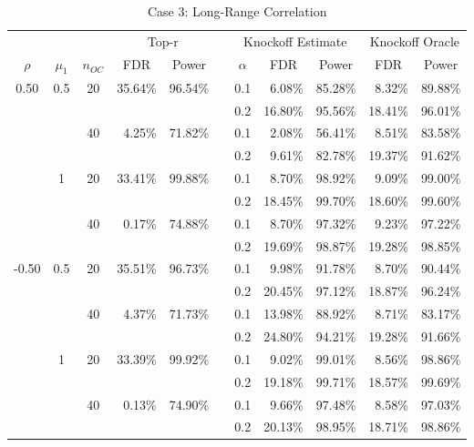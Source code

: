\documentclass[a4paper,12pt]{article}
\begin{document}
\begin{table}[htbp]
  \centering
  \caption{Case 3: Long-Range Correlation}
    \begin{tabular}{cccrrrrrrrr}
    \midrule
      &   &   & \multicolumn{2}{c}{Top-r} &   & \multicolumn{3}{c}{Knockoff Estimate} & \multicolumn{2}{c}{Knockoff Oracle} \\
\cmidrule{4-5}\cmidrule{7-11}    \multicolumn{1}{c}{$\rho$} & \multicolumn{1}{c}{$\mu_1$} & \multicolumn{1}{c}{$n_{OC}$} & \multicolumn{1}{c}{FDR} & \multicolumn{1}{c}{Power} &   & \multicolumn{1}{c}{$\alpha$} & \multicolumn{1}{c}{FDR} & \multicolumn{1}{c}{Power} & \multicolumn{1}{c}{FDR} & \multicolumn{1}{c}{Power} \\
    \midrule
    0.50 & 0.5 & 20 & 35.64\% & 96.54\% &   & 0.1 & 6.08\% & 85.28\% & 8.32\% & 89.88\% \\
      &   &   &   &   &   & 0.2 & 16.80\% & 95.56\% & 18.41\% & 96.01\% \\
      &   & 40 & 4.25\% & 71.82\% &   & 0.1 & 2.08\% & 56.41\% & 8.51\% & 83.58\% \\
      &   &   &   &   &   & 0.2 & 9.61\% & 82.78\% & 19.37\% & 91.62\% \\
      & 1 & 20 & 33.41\% & 99.88\% &   & 0.1 & 8.70\% & 98.92\% & 9.09\% & 99.00\% \\
      &   &   &   &   &   & 0.2 & 18.45\% & 99.70\% & 18.60\% & 99.60\% \\
      &   & 40 & 0.17\% & 74.88\% &   & 0.1 & 8.70\% & 97.32\% & 9.23\% & 97.22\% \\
      &   &   &   &   &   & 0.2 & 19.69\% & 98.87\% & 19.28\% & 98.85\% \\
    -0.50 & 0.5 & 20 & 35.51\% & 96.73\% &   & 0.1 & 9.98\% & 91.78\% & 8.70\% & 90.44\% \\
      &   &   &   &   &   & 0.2 & 20.45\% & 97.12\% & 18.87\% & 96.24\% \\
      &   & 40 & 4.37\% & 71.73\% &   & 0.1 & 13.98\% & 88.92\% & 8.71\% & 83.17\% \\
      &   &   &   &   &   & 0.2 & 24.80\% & 94.21\% & 19.28\% & 91.66\% \\
      & 1 & 20 & 33.39\% & 99.92\% &   & 0.1 & 9.02\% & 99.01\% & 8.56\% & 98.86\% \\
      &   &   &   &   &   & 0.2 & 19.18\% & 99.71\% & 18.57\% & 99.69\% \\
      &   & 40 & 0.13\% & 74.90\% &   & 0.1 & 9.66\% & 97.48\% & 8.58\% & 97.03\% \\
      &   &   &   &   &   & 0.2 & 20.13\% & 98.95\% & 18.71\% & 98.86\% \\
      \midrule
    \end{tabular}%
  \label{tab:addlabel}%
\end{table}%
\end{document}
